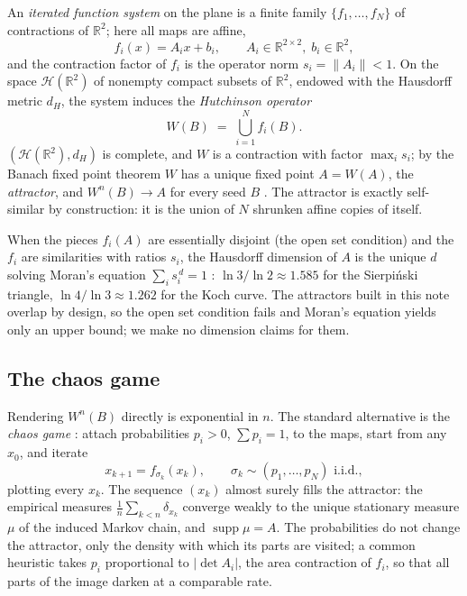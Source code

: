 \documentclass[11pt,a4paper]{article}
\theoremstyle{remark}
\newcommand{\R}{\mathbb{R}}
\newcommand{\Hs}{\mathcal{H}}
\begin{document}
An \emph{iterated function system} on the plane is a finite family
$\{f_1,\dots,f_N\}$ of contractions of $\R^2$; here all maps are affine,
\[
f_i(x) = A_i x + b_i, \qquad A_i \in \R^{2\times 2},\; b_i \in \R^2,
\]
and the contraction factor of $f_i$ is the operator norm $s_i = \lVert A_i
\rVert < 1$. On the space $\Hs(\R^2)$ of nonempty compact subsets of $\R^2$,
endowed with the Hausdorff metric $d_H$, the system induces the
\emph{Hutchinson operator}
\[
W(B) \;=\; \bigcup_{i=1}^{N} f_i(B).
\]
$(\Hs(\R^2), d_H)$ is complete, and $W$ is a contraction with factor
$\max_i s_i$; by the Banach fixed point theorem $W$ has a unique fixed point
$A = W(A)$, the \emph{attractor}, and $W^n(B) \to A$ for every seed $B$
\cite{hutchinson1981}. The attractor is exactly self-similar by
construction: it is the union of $N$ shrunken affine copies of itself.

When the pieces $f_i(A)$ are essentially disjoint (the open set condition)
and the $f_i$ are similarities with ratios $s_i$, the Hausdorff dimension of
$A$ is the unique $d$ solving Moran's equation $\sum_i s_i^{\,d} = 1$
\cite{moran1946,falconer1990}: $\ln 3/\ln 2 \approx 1.585$ for the
Sierpiński triangle, $\ln 4/\ln 3 \approx 1.262$ for the Koch curve. The
attractors built in this note overlap by design, so the open set condition
fails and Moran's equation yields only an upper bound; we make no dimension
claims for them.

\subsection{The chaos game}

Rendering $W^n(B)$ directly is exponential in $n$. The standard alternative
is the \emph{chaos game} \cite{barnsley1988}: attach probabilities $p_i > 0$,
$\sum p_i = 1$, to the maps, start from any $x_0$, and iterate
\[
x_{k+1} = f_{\sigma_k}(x_k), \qquad
\sigma_k \sim (p_1,\dots,p_N) \text{ i.i.d.},
\]
plotting every $x_k$. The sequence $(x_k)$ almost surely fills the attractor:
the empirical measures $\frac1n \sum_{k<n} \delta_{x_k}$ converge weakly to
the unique stationary measure $\mu$ of the induced Markov chain, and
$\operatorname{supp}\mu = A$. The probabilities do not change the attractor,
only the density with which its parts are visited; a common heuristic
\cite{barnsley1988} takes $p_i$ proportional to $\lvert\det A_i\rvert$, the
area contraction of $f_i$, so that all parts of the image darken at a
comparable rate.
\end{document}
